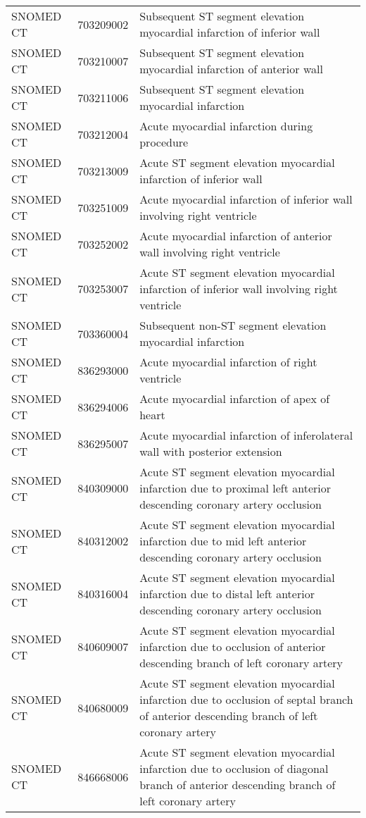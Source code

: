 \begin{longtable}{p{}p{}p{}}
  SNOMED CT & 703209002 & Subsequent ST segment elevation myocardial infarction of inferior wall \\ 
  SNOMED CT & 703210007 & Subsequent ST segment elevation myocardial infarction of anterior wall \\ 
  SNOMED CT & 703211006 & Subsequent ST segment elevation myocardial infarction \\ 
  SNOMED CT & 703212004 & Acute myocardial infarction during procedure \\ 
  SNOMED CT & 703213009 & Acute ST segment elevation myocardial infarction of inferior wall \\ 
  SNOMED CT & 703251009 & Acute myocardial infarction of inferior wall involving right ventricle \\ 
  SNOMED CT & 703252002 & Acute myocardial infarction of anterior wall involving right ventricle \\ 
  SNOMED CT & 703253007 & Acute ST segment elevation myocardial infarction of inferior wall involving right ventricle \\ 
  SNOMED CT & 703360004 & Subsequent non-ST segment elevation myocardial infarction \\ 
  SNOMED CT & 836293000 & Acute myocardial infarction of right ventricle \\ 
  SNOMED CT & 836294006 & Acute myocardial infarction of apex of heart \\ 
  SNOMED CT & 836295007 & Acute myocardial infarction of inferolateral wall with posterior extension \\ 
  SNOMED CT & 840309000 & Acute ST segment elevation myocardial infarction due to proximal left anterior descending coronary artery occlusion \\ 
  SNOMED CT & 840312002 & Acute ST segment elevation myocardial infarction due to mid left anterior descending coronary artery occlusion \\ 
  SNOMED CT & 840316004 & Acute ST segment elevation myocardial infarction due to distal left anterior descending coronary artery occlusion \\ 
  SNOMED CT & 840609007 & Acute ST segment elevation myocardial infarction due to occlusion of anterior descending branch of left coronary artery \\ 
  SNOMED CT & 840680009 & Acute ST segment elevation myocardial infarction due to occlusion of septal branch of anterior descending branch of left coronary artery \\ 
  SNOMED CT & 846668006 & Acute ST segment elevation myocardial infarction due to occlusion of diagonal branch of anterior descending branch of left coronary artery \\ 

\end{longtable}
